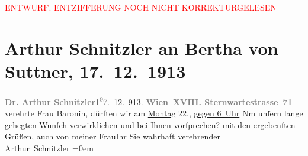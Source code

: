 
\begin{center}
            \textcolor{red}{ENTWURF. ENTZIFFERUNG NOCH NICHT KORREKTURGELESEN}
                      \end{center}
            
               \section[Arthur Schnitzler an Bertha von Suttner, 17. 12. 1913]{ Arthur Schnitzler an Bertha von Suttner,
                    17. 12. 1913}\nopagebreak{}\rehead{ }\begin{ledgroupsized}[t]{13cm}\normalsize\beginnumbering{} \toendnotes[C]{\smallbreak\pagebreak[2]} 
\toendnotes[C]{\smallbreak}\pstart
           \noindent{}{\pb}\textcolor{gray}{\textbf{Dr. Arthur Schnitzler}}\hfill 1\substVorne{}\textsuperscript{\textcolor{gray}{9}}\substDazwischen{}7\substHinten{}. 12. 913.\pend
           \pstart
           \textcolor{gray}{\textbf{Wien XVIII. Sternwartestrasse 71}}\pend
           \pstart{}verehrte Frau Baronin, \pend\pstart
           dürften wir am \uline{Montag} 22., \uline{gegen 6 Uhr} Nm unſern lange gehegten Wunſch verwirklichen und bei Ihnen
                    vorſprechen?\pend
           \pstart
           mit den ergebenſten Grüßen, auch von meiner FrauIhr Sie wahrhaft verehrender{\\[\baselineskip]}\spacefill\mbox{Arthur Schnitzler}\pend
           \leftskip=0em{}\endnumbering{}\end{ledgroupsized}  \newcommand{\dateiname}{L02163}\newcommand{\titel}{Arthur Schnitzler an Bertha von Suttner, 17. 12. 1913}\newcommand{\editorInnen}{Martin Anton Müller und Gerd-Hermann Susen}
      